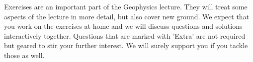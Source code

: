 \documentclass[a4paper,12pt]{article}
\begin{document}
\begin{tcolorbox}[enhanced jigsaw,breakable,pad at break*=1mm,
    colback=blue!5!white,colframe=burgundy,title=Expectations for Exercises]
    Exercises are an important part of the Geophysics lecture. They will treat some aspects of the lecture in more detail, but also cover new ground. We expect that you work on the exercises at home and we will discuss questions and solutions interactively together. Questions that are marked with 'Extra' are not required but geared to stir
     your further interest. We will surely support you if you tackle those as well. 
\end{tcolorbox}




%   
%   
%   




%   
%   
%   


  
  
\end{document}

